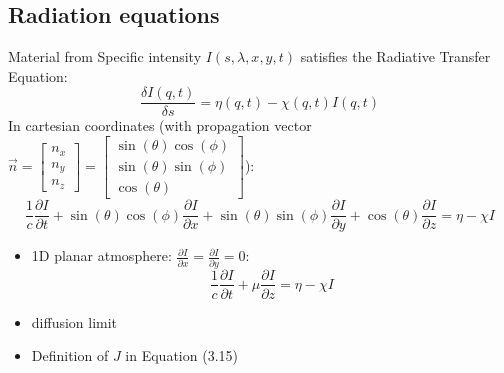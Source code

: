 \documentclass[../main/main.tex]{subfiles}
\begin{document}
\subsection{Radiation equations}
Material from \cite{TheoryStellarAtmospheres2014}
Specific intensity $I(s,\lambda,x,y,t)$ satisfies the Radiative Transfer Equation:
\begin{equation}
\boxed{\frac{\delta I(q,t)}{\delta s} = \eta (q,t) - \chi(q,t) I(q,t)}
\label{GENERAL_RT_EQUATION}
\end{equation}
In cartesian coordinates (with propagation vector $\vec{n} = \left[ \begin{matrix} n_x \\ n_y \\ n_z \end{matrix}  \right]  = \left[ \begin{matrix} \sin(\theta) \cos(\phi) \\ \sin(\theta) \sin(\phi)  \\ \cos(\theta) \end{matrix}  \right]$):
\begin{equation}
\frac{1}{c}\frac{\partial I}{\partial t} + \sin(\theta)\cos(\phi)\frac{\partial I}{\partial x} + \sin(\theta)\sin(\phi)\frac{\partial I}{\partial y} + \cos(\theta) \frac{\partial I}{\partial z} = \eta - \chi I
\end{equation}
\begin{itemize}
\item 1D planar atmosphere: $\frac{\partial I}{\partial x} = \frac{\partial I}{\partial y} = 0$:
\begin{equation}
\frac{1}{c} \frac{\partial I}{\partial t} + \mu \frac{\partial I}{\partial z} = \eta - \chi I
\end{equation}

\item diffusion limit
\item Definition of $J$ in Equation (3.15)
\end{itemize}
\end{document}
